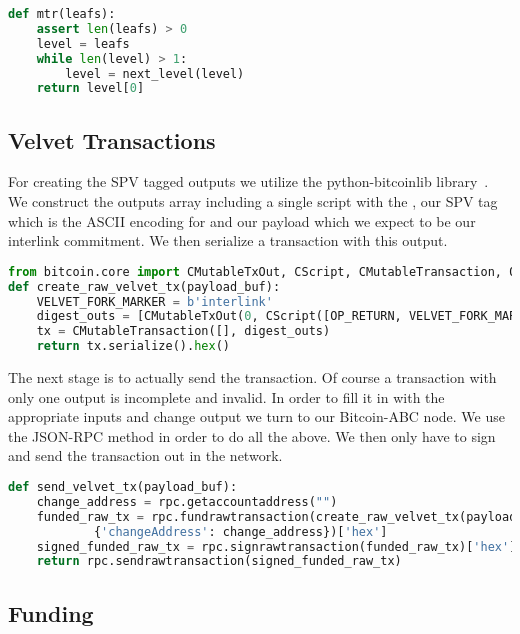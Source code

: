 \begin{lstlisting}[language=Python]
def mtr(leafs):
    assert len(leafs) > 0
    level = leafs
    while len(level) > 1:
        level = next_level(level)
    return level[0]
\end{lstlisting}

\subsection{Velvet Transactions}

For creating the SPV tagged outputs we utilize the python-bitcoinlib library~\cite{python-bitcoinlib}. We construct the outputs array including a single script with the , our SPV tag which is the ASCII encoding for  and our payload which we expect to be our interlink commitment. We then serialize a transaction with this output.

\begin{lstlisting}[language=Python]
from bitcoin.core import CMutableTxOut, CScript, CMutableTransaction, OP_RETURN
def create_raw_velvet_tx(payload_buf):
    VELVET_FORK_MARKER = b'interlink'
    digest_outs = [CMutableTxOut(0, CScript([OP_RETURN, VELVET_FORK_MARKER, payload_buf]))]
    tx = CMutableTransaction([], digest_outs)
    return tx.serialize().hex()
\end{lstlisting}

The next stage is to actually send the transaction. Of course a transaction with only one output is incomplete and invalid. In order to fill it in with the appropriate inputs and change output we turn to our Bitcoin-ABC node. We use the  JSON-RPC method in order to do all the above. We then only have to sign and send the transaction out in the network.

\begin{lstlisting}[language=Python]
def send_velvet_tx(payload_buf):
    change_address = rpc.getaccountaddress("")
    funded_raw_tx = rpc.fundrawtransaction(create_raw_velvet_tx(payload_buf),
            {'changeAddress': change_address})['hex']
    signed_funded_raw_tx = rpc.signrawtransaction(funded_raw_tx)['hex']
    return rpc.sendrawtransaction(signed_funded_raw_tx)
\end{lstlisting}

\subsection{Funding}

